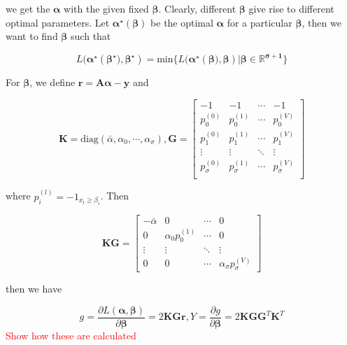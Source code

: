 we get the $\boldsymbol{\alpha}$ with the given fixed $\boldsymbol{\beta}$. Clearly, different $\boldsymbol{\beta}$ give rise to different optimal parameters. Let $\boldsymbol{\alpha^\star}(\boldsymbol{\beta})$ be the optimal $\boldsymbol{\alpha}$ for a particular $\boldsymbol{\beta}$, then we want to find $\boldsymbol{\beta}$ such that


\begin{equation}
	L(\boldsymbol{\alpha^\star}(\boldsymbol{\beta^\star)}, \boldsymbol{\beta^\star})=\text{min}\{L(\boldsymbol{\alpha^\star}(\boldsymbol{\beta)}, \boldsymbol{\beta}) | \boldsymbol{\beta\in\mathbb{R}^{\sigma+1}}\}
\end{equation}

For $\boldsymbol{\beta}$, we define $\boldsymbol{r}=\boldsymbol{A\alpha-y}$ and 

$$
\boldsymbol{K}=\text{diag}(\bar{\alpha},\alpha_0, \cdots, \alpha_\sigma), \boldsymbol{G}=\begin{bmatrix}
 -1 & -1 & \cdots & -1 \\
  p_0^{(0)} & p_0^{(1)} & \cdots & p_0^{(V)} \\
  p_1^{(0)} & p_1^{(1)} & \cdots & p_1^{(V)} \\
  \vdots & \vdots & \ddots & \vdots \\
  p_\sigma^{(0)} & p_\sigma^{(1)}& \cdots & p_\sigma^{(V)} \\
\end{bmatrix}
$$

where $p_i^{(l)}=-1_{x_l\geq \beta_i}$. Then

$$
\boldsymbol{KG}=\begin{bmatrix}
 -\bar{\alpha} & 0 & \cdots & 0 \\
 0 & \alpha_0p_0^{(1)} & \cdots  & 0 \\
 \vdots & \vdots & \ddots & \vdots \\
 0 & 0 & \cdots & \alpha_\sigma p_\sigma^{(V)}
\end{bmatrix}
$$

then we have 

\begin{equation}
	g=\frac{\partial L(\boldsymbol{\alpha},\boldsymbol{\beta})}{\partial \boldsymbol{\beta}}=2\boldsymbol{KGr},
	Y=\frac{\partial g}{\partial \boldsymbol{\beta}}=2\boldsymbol{KGG}^T \boldsymbol{K}^T
\end{equation}
\textcolor{red}{Show how these are calculated}

